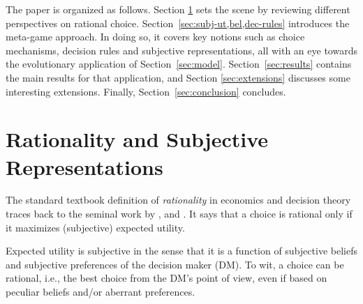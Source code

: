 \documentclass[fleqn,reqno,12pt]{article}
\theoremstyle{Satz}
\theoremstyle{Bsp}
\begin{document}

The paper is organized as follows. Section \ref{sec:rati--subj} sets the scene by reviewing
different perspectives on rational choice. Section~\ref{sec:subj-ut,bel,dec-rules} introduces
the meta-game approach. In doing so, it covers key notions such as choice mechanisms, decision
rules and subjective representations, all with an eye towards the evolutionary application of
Section~\ref{sec:model}. Section~\ref{sec:results} contains the main results for that
application, and Section \ref{sec:extensions} discusses some interesting extensions. Finally,
Section~\ref{sec:conclusion} concludes.

\section{Rationality and Subjective Representations}
\label{sec:rati--subj}

The standard textbook definition of \textit{rationality} in economics and decision theory
traces back to the seminal work by \citet{deFinetti37}, \citet{Neumannvon-NeumannMorgenstern1944:Theory-of-Games}
and \citet{Savage1954:The-Foundations}. It says that a choice is rational only if it maximizes
(subjective) expected utility.


\noindent Expected utility is subjective in the sense that it is a function of subjective
beliefs and subjective preferences of the decision maker (DM). To wit, a choice can be
rational, i.e., the best choice from the DM's point of view, even if based on peculiar beliefs
and/or aberrant preferences. %
\end{document}
